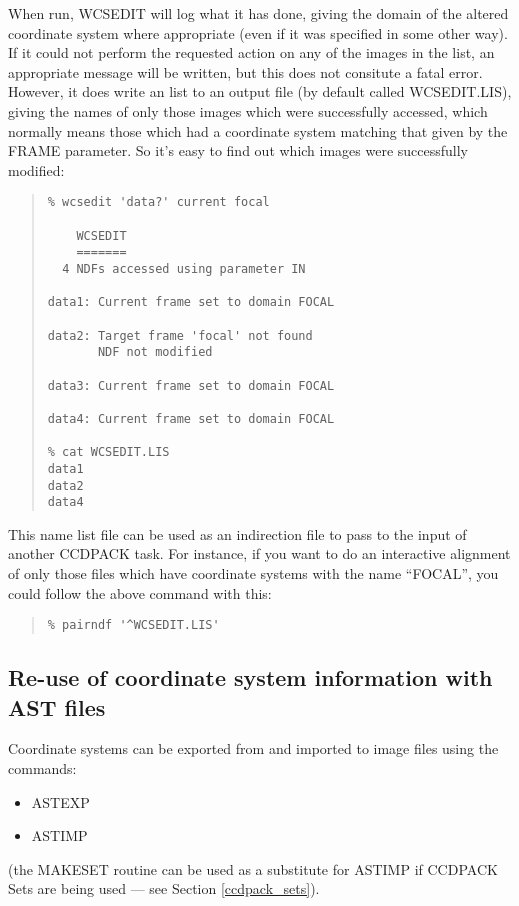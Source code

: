 \documentclass[twoside,11pt]{article}
\newcommand{\htmlref}[2]{#1}
\newcommand{\xlabel}[1]{}
\renewcommand{\_}{\texttt{\symbol{95}}}
\newenvironment{myquote}{\begin{quote}\begin{small}}{\end{small}\end{quote}}
\newcommand{\routine}[1]{{\sc #1}}
\newcommand{\xroutine}[1]{\htmlref{{\sc #1}}{#1}}
\begin{document}
When run, \routine{WCSEDIT} will log what it has done, 
giving the domain of the altered coordinate system where appropriate
(even if it was specified in some other way).
If it could not perform the requested action on any of the images
in the list, an appropriate message will be written, but this
does not consitute a fatal error.
However, it does write an list to an output file (by default called
WCSEDIT.LIS), giving the names of only those images 
which were successfully accessed, which normally
means those which had a coordinate system matching that
given by the FRAME parameter.  So it's easy to find out which 
images were successfully modified:
\begin{myquote}
\begin{verbatim}
% wcsedit 'data?' current focal

    WCSEDIT
    =======
  4 NDFs accessed using parameter IN

data1: Current frame set to domain FOCAL

data2: Target frame 'focal' not found
       NDF not modified

data3: Current frame set to domain FOCAL

data4: Current frame set to domain FOCAL

% cat WCSEDIT.LIS
data1
data2
data4
\end{verbatim}
\end{myquote}
This name list file can be used as an indirection file to pass to the 
input of another CCDPACK task.  For instance, if you want to do an
interactive alignment of only those files which have coordinate
systems with the name ``FOCAL'', you could follow the above command
with this:
\begin{myquote}
\begin{verbatim}
% pairndf '^WCSEDIT.LIS'
\end{verbatim}
\end{myquote}



\subsection{\xlabel{astfiles}\label{astfiles}Re-use of coordinate system
            information with AST files}

Coordinate systems can be exported from and imported to
image files using the commands:
\begin{itemize}
\item \xroutine{ASTEXP}
\item \xroutine{ASTIMP}
\end{itemize}
(the \xroutine{MAKESET} routine can be used as a substitute for
\routine{ASTIMP} if CCDPACK Sets are being used --- 
see Section \ref{ccdpack_sets}).
\end{document}
